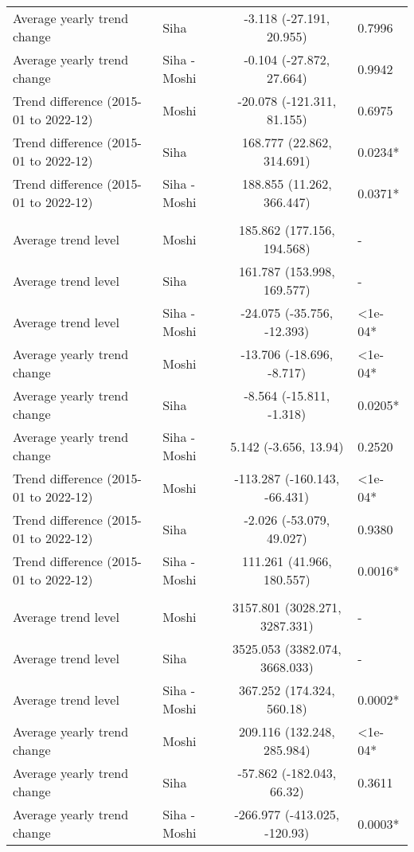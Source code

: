 \begin{longtable}{l|lcl}
Average yearly trend change & Siha & -3.118 (-27.191, 20.955) & 0.7996 \\ 
Average yearly trend change & Siha - Moshi & -0.104 (-27.872, 27.664) & 0.9942 \\ 
Trend difference (2015-01 to 2022-12) & Moshi & -20.078 (-121.311, 81.155) & 0.6975 \\ 
Trend difference (2015-01 to 2022-12) & Siha & 168.777 (22.862, 314.691) & 0.0234* \\ 
Trend difference (2015-01 to 2022-12) & Siha - Moshi & 188.855 (11.262, 366.447) & 0.0371* \\ 
\midrule\addlinespace[2.5pt]
\multicolumn{4}{l}{Respiratory Diseases} \\[2.5pt] 
\midrule\addlinespace[2.5pt]
Average trend level & Moshi & 185.862 (177.156, 194.568) & - \\ 
Average trend level & Siha & 161.787 (153.998, 169.577) & - \\ 
Average trend level & Siha - Moshi & -24.075 (-35.756, -12.393) & <1e-04* \\ 
Average yearly trend change & Moshi & -13.706 (-18.696, -8.717) & <1e-04* \\ 
Average yearly trend change & Siha & -8.564 (-15.811, -1.318) & 0.0205* \\ 
Average yearly trend change & Siha - Moshi & 5.142 (-3.656, 13.94) & 0.2520 \\ 
Trend difference (2015-01 to 2022-12) & Moshi & -113.287 (-160.143, -66.431) & <1e-04* \\ 
Trend difference (2015-01 to 2022-12) & Siha & -2.026 (-53.079, 49.027) & 0.9380 \\ 
Trend difference (2015-01 to 2022-12) & Siha - Moshi & 111.261 (41.966, 180.557) & 0.0016* \\ 
\midrule\addlinespace[2.5pt]
\multicolumn{4}{l}{Respiratory Infections} \\[2.5pt] 
\midrule\addlinespace[2.5pt]
Average trend level & Moshi & 3157.801 (3028.271, 3287.331) & - \\ 
Average trend level & Siha & 3525.053 (3382.074, 3668.033) & - \\ 
Average trend level & Siha - Moshi & 367.252 (174.324, 560.18) & 0.0002* \\ 
Average yearly trend change & Moshi & 209.116 (132.248, 285.984) & <1e-04* \\ 
Average yearly trend change & Siha & -57.862 (-182.043, 66.32) & 0.3611 \\ 
Average yearly trend change & Siha - Moshi & -266.977 (-413.025, -120.93) & 0.0003* \\ 

\end{longtable}
